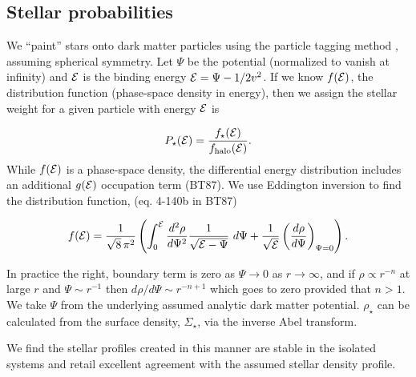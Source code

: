 \subsection{Stellar probabilities}\label{stellar-probabilities}

We ``paint'' stars onto dark matter particles using the particle tagging
method \citep[e.g.][]{bullock+johnston2005}, assuming spherical
symmetry. Let \(\Psi\) be the potential (normalized to vanish at
infinity) and \({\cal E}\) is the binding energy
\({\cal E} = \Psi - 1/2 v^2\). If we know \(f({\cal E})\), the
distribution function (phase-space density in energy), then we assign
the stellar weight for a given particle with energy \({\cal E}\) is

\begin{equation}{
P_\star({\cal E}) = \frac{f_\star({\cal E})}{f_{\rm halo}({\cal E})}.
}\end{equation} While \(f({\cal E})\) is a phase-space density, the
differential energy distribution includes an additional \(g({\cal E})\)
occupation term (BT87). We use Eddington inversion to find the
distribution function, (eq. 4-140b in BT87)

\begin{equation}{
f({\cal E}) = \frac{1}{\sqrt{8}\, \pi^2}\left( \int_0^{\cal E} \frac{d^2\rho}{d\Psi^2} \frac{1}{\sqrt{{\cal E} - \Psi}}\ d\Psi + \frac{1}{\sqrt{\cal E}} \left(\frac{d\rho}{d\Psi}\right)_{\Psi=0} \right).
}\end{equation}

In practice the right, boundary term is zero as \(\Psi \to 0\) as
\(r\to\infty\), and if \(\rho \propto r^{-n}\) at large \(r\) and
\(\Psi \sim r^{-1}\) then \(d\rho / d\Psi \sim r^{-n+1}\) which goes to
zero provided that \(n > 1\). We take \(\Psi\) from the underlying
assumed analytic dark matter potential. \(\rho_\star\) can be calculated
from the surface density, \(\Sigma_\star\), via the inverse Abel
transform.

We find the stellar profiles created in this manner are stable in the
isolated systems and retail excellent agreement with the assumed stellar
density profile.
